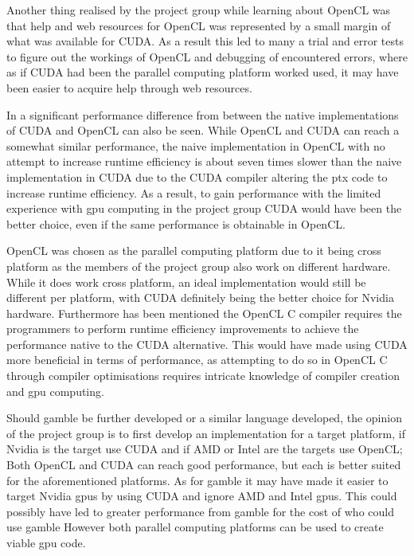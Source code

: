 Another thing realised by the project group while learning about OpenCL was that help and web resources for OpenCL was represented by a small margin of what was available for CUDA.
As a result this led to many a trial and error tests to figure out the workings of OpenCL and debugging of encountered errors, where as if CUDA had been the parallel computing platform worked used, it may have been easier to acquire help through web resources.

In  a significant performance difference from between the native implementations of CUDA and OpenCL can also be seen.
While OpenCL and CUDA can reach a somewhat similar performance, the naive implementation in OpenCL with no attempt to increase runtime efficiency is about seven times slower than the naive implementation in CUDA due to the CUDA compiler altering the \acrshort{ptx} code to increase runtime efficiency.
As a result, to gain performance with the limited experience with \acrshort{gpu} computing in the project group CUDA would have been the better choice, even if the same performance is obtainable in OpenCL.

OpenCL was chosen as the parallel computing platform due to it being cross platform as the members of the project group also work on different hardware.
While it does work cross platform, an ideal implementation would still be different per platform, with CUDA definitely being the better choice for Nvidia hardware.
Furthermore has been mentioned the OpenCL C compiler requires the programmers to perform runtime efficiency improvements to achieve the performance native to the CUDA alternative.
This would have made using CUDA more beneficial in terms of performance, as attempting to do so in OpenCL C through compiler optimisations requires intricate knowledge of compiler creation and \acrshort{gpu} computing.

Should \gls{gamble} be further developed or a similar language developed, the opinion of the project group is to first develop an implementation for a target platform, if Nvidia is the target use CUDA and if AMD or Intel are the targets use OpenCL; Both OpenCL and CUDA can reach good performance, but each is better suited for the aforementioned platforms.
As for \gls{gamble} it may have made it easier to target Nvidia \acrshort{gpu}s by using CUDA and ignore AMD and Intel \acrshort{gpu}s. 
This could possibly have led to greater performance from \acrshort{gamble} for the cost of who could use \gls{gamble}
However both parallel computing platforms can be used to create viable \acrshort{gpu} code.